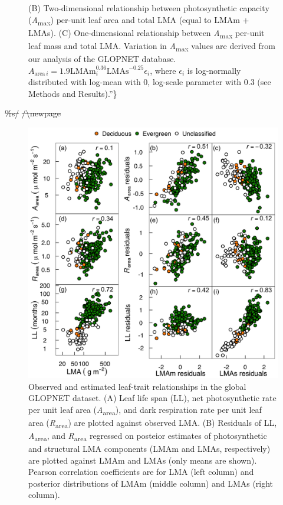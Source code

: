 \documentclass[
  12pt,
]{article}
\providecommand{\DIFdeltex}[1]{{\protect\color{red}\sout{#1}}}                      %
\providecommand{\DIFdelbegin}{} %
\providecommand{\DIFdelend}{} %
\providecommand{\DIFaddendFL}{} %
\providecommand{\DIFdel}[1]{\texorpdfstring{\DIFdeltex{#1}}{}} %
\newcommand{\DIFscaledelfig}{0.5}
\newlength{\DIFdelgraphicswidth} %
\newlength{\DIFdelgraphicsheight} %
\newcommand{\DIFdelincludegraphics}[2][]{%
\sbox{\DIFdelgraphicsbox}{\DIFOincludegraphics[#1]{#2}}%
\settoboxwidth{\DIFdelgraphicswidth}{\DIFdelgraphicsbox} %
\settoboxtotalheight{\DIFdelgraphicsheight}{\DIFdelgraphicsbox} %
\scalebox{\DIFscaledelfig}{%
\parbox[b]{\DIFdelgraphicswidth}{\usebox{\DIFdelgraphicsbox}\\[-\baselineskip] \rule{\DIFdelgraphicswidth}{0em}}\llap{\resizebox{\DIFdelgraphicswidth}{\DIFdelgraphicsheight}{%
\setlength{\unitlength}{\DIFdelgraphicswidth}%
\begin{picture}(1,1)%
\thicklines\linethickness{2pt} %
{\color[rgb]{1,0,0}\put(0,0){\framebox(1,1){}}}%
{\color[rgb]{1,0,0}\put(0,0){\line( 1,1){1}}}%
{\color[rgb]{1,0,0}\put(0,1){\line(1,-1){1}}}%
\end{picture}%
}\hspace*{3pt}}} %
} %
\DeclareRobustCommand{\DIFdelbegin}{\DIFOdelbegin \let\includegraphics\DIFdelincludegraphics} %
\DeclareRobustCommand{\DIFdelend}{\DIFOaddend \let\includegraphics\DIFOincludegraphics} %
\DeclareRobustCommand{\DIFaddendFL}{\DIFOaddendFL \let\includegraphics\DIFOincludegraphics} %
\begin{document}
\begin{figure}
{{(B) Two-dimensional relationship between photosynthetic capacity (\emph{A}\textsubscript{max}) per-unit leaf area and total LMA (equal to LMAm + LMAs).
(C) One-dimensional relationship between \emph{A}\textsubscript{max} per-unit leaf mass and total LMA. Variation in \emph{A}\textsubscript{max} values are derived from our analysis of the GLOPNET database. \(A_{\mathrm{area} \, i}=1.9\mathrm{LMAm}_i^{0.36}\mathrm{LMAs}^{-0.25}\epsilon_i\), where \(\epsilon_i\) is log-normally distributed with log-mean with 0, log-scale parameter with 0.3 (see Methods and Results).''\}}\label{fig:Hplt}
}
\DIFaddendFL \end{figure}
\DIFdelbegin %

\DIFdel{\%s/}%
\DIFdel{/\textbackslash newpage
}\DIFdelend 

\begin{figure}
\hypertarget{fig:GLplt}{%
\centering
\includegraphics{../figs/GL_3.png}
\caption{Observed and estimated leaf-trait relationships in the global GLOPNET dataset.
(A) Leaf life span (LL), net photosynthetic rate per unit leaf area (\emph{A}\textsubscript{area}), and dark respiration rate per unit leaf area (\emph{R}\textsubscript{area}) are plotted against observed LMA.
(B) Residuals of LL, \emph{A}\textsubscript{area}, and \emph{R}\textsubscript{area} regressed on posteior estimates of photosynthetic and structural LMA components (LMAm and LMAs, respectively) are plotted against LMAm and LMAs (only means are shown).
Pearson correlation coefficients are for LMA (left column) and posterior distributions of LMAm (middle column) and LMAs (right column).}\label{fig:GLplt}
}
\end{figure}
\end{document}

